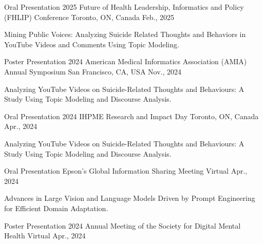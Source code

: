 
\vspace*{0.05cm}
\begin{cventries}
\cventry
{Oral Presentation} %
{2025 Future of Health Leadership, Informatics and Policy (FHLIP) Conference} %
{Toronto, ON, Canada} %
{Feb., 2025} %
{ %
\begin{cvitems}
\item {Mining Public Voices: Analyzing Suicide Related Thoughts and Behaviors in YouTube Videos and Comments Using Topic Modeling.}
\end{cvitems}
}
\cventry
{Poster Presentation} %
{2024 American Medical Informatics Association (AMIA) Annual Symposium} %
{San Francisco, CA, USA} %
{Nov., 2024} %
{ %
\begin{cvitems}
\item {Analyzing YouTube Videos on Suicide-Related Thoughts and Behaviours: A Study Using Topic Modeling and Discourse Analysis.}
\end{cvitems}
}
\cventry
{Oral Presentation} %
{2024 IHPME Research and Impact Day} %
{Toronto, ON, Canada} %
{Apr., 2024} %
{ %
\begin{cvitems}
\item {Analyzing YouTube Videos on Suicide-Related Thoughts and Behaviours: A Study Using Topic Modeling and Discourse Analysis.}
\end{cvitems}
}
\cventry
{Oral Presentation} %
{Epson's Global Information Sharing Meeting} %
{Virtual} %
{Apr., 2024} %
{ %
\begin{cvitems}
\item {Advances in Large Vision and Language Models Driven by Prompt Engineering for Efficient Domain Adaptation.}
\end{cvitems}
}
\cventry
{Poster Presentation} %
{2024 Annual Meeting of the Society for Digital Mental Health} %
{Virtual} %
{Apr., 2024} %
{ %
\begin{cvitems}

\end{cvitems}}
\end{cventries}
